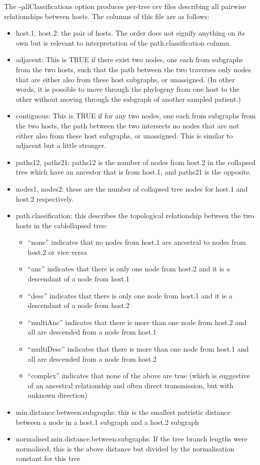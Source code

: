 The \c{--allClassifications} option produces per-tree csv files describing all pairwise relationships between hosts.
The columns of this file are as follows:
\begin{itemize}
\item host.1, host.2: the pair of hosts.
The order does not signify anything on its own but is relevant to interpretation of the path.classification column.
\item adjacent: This is TRUE if there exist two nodes, one each from subgraphs from the two hosts, such that the path between the two traverses only nodes that are either also from these host subgraphs, or unassigned.
(In other words, it is possible to move through the phylogeny from one host to the other without moving through the subgraph of another sampled patient.)
\item contiguous: This is TRUE if for any two nodes, one each from subgraphs from the two hosts, the path between the two intersects no nodes that are not either also from these host subgraphs, or unassigned.
This is similar to adjacent but a little stronger.
\item paths12, paths21: paths12 is the number of nodes from host.2 in the collapsed tree which have an ancestor that is from host.1, and paths21 is the opposite.
\item nodes1, nodes2: these are the number of collapsed tree nodes for host.1 and host.2 respectively.
\item path.classification: this describes the topological relationship between the two hosts in the cablollapsed tree: \begin{itemize}                                                                                                                    
\item ``none'' indicates that no nodes from host.1 are ancestral to nodes from host.2 or vice versa
\item ``anc'' indicates that there is only one node from host.2 and it is a descendant of a node from host.1
\item ``desc'' indicates that there is only one node from host.1 and it is a descendant of a node from host.2
\item ``multiAnc'' indicates that there is more than one node from host.2 and all are descended from a node from host.1
\item ``multiDesc'' indicates that there is more than one node from host.1 and all are descended from a node from host.2
\item ``complex'' indicates that none of the above are true (which is suggestive of an ancestral relationship and often direct transmission, but with unknown direction)
\end{itemize}
\item min.distance.between.subgraphs: this is the smallest  patristic distance between a node in a host.1 subgraph and a host.2 subgraph
\item normalised.min.distance.between.subgraphs: If the tree branch lengths were normalised, this is the above distance but divided by the normalisation constant for this tree
\end{itemize}

